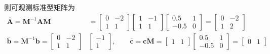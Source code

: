 则可观测标准型矩阵为
\begin{align*}
	\overline{\bm{A}} = \bm{M}^{-1}\bm{A}\bm{M}&=
	\begin{bmatrix}
		0 & -2\\
		1 & 1
	\end{bmatrix}
	\begin{bmatrix}
		1 & -1\\
		1 & 1
	\end{bmatrix}
	\begin{bmatrix}
		0.5 & 1\\
		-0.5 & 0
	\end{bmatrix}
	= 
	\begin{bmatrix}
		0 & -2\\
		1 & 2
	\end{bmatrix}
	\\[0.5em]
	\overline{\bm{b}} = \bm{M}^{-1}\bm{b} = 
	\begin{bmatrix}
		0 & -2\\
		1 & 1
	\end{bmatrix}
	&
	\begin{bmatrix}
		-1\\
		1
	\end{bmatrix}
	,
	\qquad 
	\overline{\bm{c}} = \bm{cM} =
	\begin{bmatrix}
		1 & 1
	\end{bmatrix}
	\begin{bmatrix}
		0.5 & 1\\
		-0.5 & 0
	\end{bmatrix}
	= \begin{bmatrix}
		0 & 1
	\end{bmatrix}
\end{align*}

